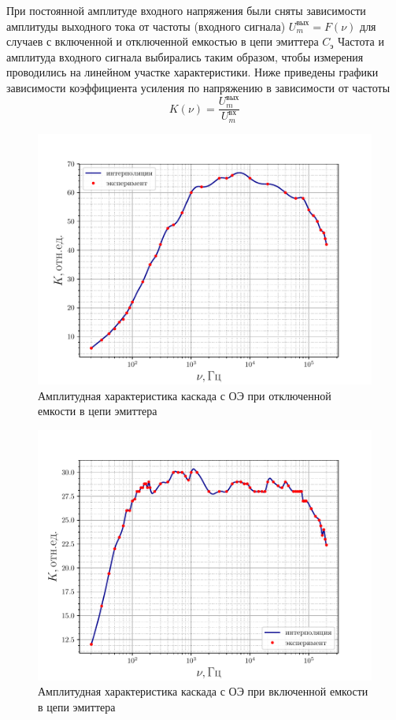При постоянной амплитуде входного напряжения были сняты зависимости амплитуды выходного тока от частоты (входного сигнала) $U_m^{\text{вых}}=F(\nu)$ для случаев с включенной и отключенной емкостью в цепи эмиттера $C_{\text{э}}$
Частота и амплитуда входного сигнала выбирались таким образом, чтобы измерения проводились на линейном участке характеристики.
Ниже приведены графики зависимости коэффициента усиления по напряжению в зависимости от частоты 
$$K(\nu)=\frac{U_m^{\text{вых}}}{U_m^{\text{вх}}}$$ 
\begin{figure}[H]
 	\centering
 	\includegraphics[width=\linewidth]{fig/5_C_off.pdf}
 	\caption{Амплитудная характеристика каскада с ОЭ при отключенной емкости в цепи эмиттера}
 	\label{fig:Coff2}
 \end{figure} 


\begin{figure}[H]
 	\centering
 	\includegraphics[width=\linewidth]{fig/5_C_on.pdf}
 	\caption{Амплитудная характеристика каскада с ОЭ при включенной емкости в цепи эмиттера}
 	\label{fig:Con2}
 \end{figure} 


